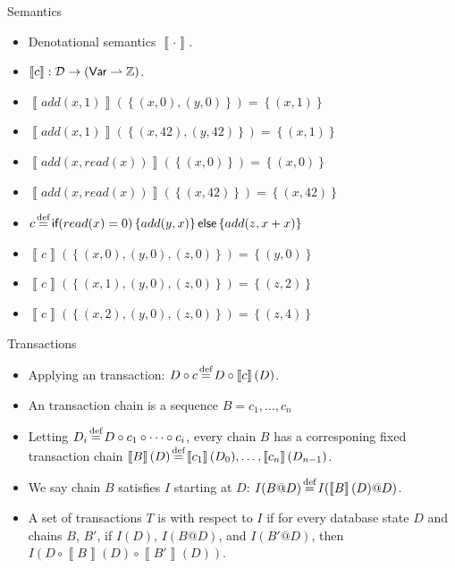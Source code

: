 \documentclass[xcolor={dvipsnames,svgnames,table}]{beamer}
\newcommand{\defeq}{\stackrel{\mathclap{\normalfont\mbox{\scriptsize def}}}{=}}
\newcommand{\denote}[1]{\left\llbracket#1\right\rrbracket}
\newcommand{\set}[1]{\left\{#1\right\}}
\begin{document}
\begin{frame}{\imp{} Semantics}
  \begin{itemize}
    \item Denotational semantics $\denote{\cdot}$.
    \item $\denote{c}: \dbs \to (\var \rightharpoonup \ints)$.
    \item $\denote{add(x, 1)}(\set{(x, 0), (y, 0)}) = \set{(x, 1)}$
    \item $\denote{add(x, 1)}(\set{(x, 42), (y, 42)}) = \set{(x, 1)}$
    \item $\denote{add(x, read(x))}(\set{(x, 0)}) = \set{(x, 0)}$
    \item $\denote{add(x, read(x))}(\set{(x, 42)}) = \set{(x, 42)}$
    \item $c \defeq \impif{read(x)=0}{add(y, x)}{add(z, x + x)}$
    \item $\denote{c}(\set{(x, 0), (y, 0), (z, 0)}) = \set{(y, 0)}$
    \item $\denote{c}(\set{(x, 1), (y, 0), (z, 0)}) = \set{(z, 2)}$
    \item $\denote{c}(\set{(x, 2), (y, 0), (z, 0)}) = \set{(z, 4)}$
  \end{itemize}
\end{frame}

\begin{frame}{\imp{} Transactions}
  \begin{itemize}
    \item
      Applying an \imp{} transaction: $D \circ c \defeq D \circ \denote{c}(D)$.
    \item
      An \imp{} transaction chain is a sequence $B = c_1, \ldots, c_n$
    \item
      Letting $D_i \defeq D \circ c_1 \circ \cdots \circ c_i$, every \imp{}
      chain $B$ has a corresponing fixed transaction chain $\denote{B}(D)
      \defeq \denote{c_1}(D_0), \ldots, \denote{c_n}(D_{n-1})$.
    \item
      We say \imp{} chain $B$ satisfies $I$ starting at $D$: $I(B@D) \defeq
      I(\denote{B}(D) @ D)$.
    \item
      A set of \imp{} transactions $T$ is \emph{\iconfluent{}} with respect to
      $I$ if for every database state $D$ and \imp{} chains $B$, $B'$, if
      $I(D)$, $I(B@D)$, and $I(B'@D)$, then $I(D \circ \denote{B}(D) \circ
      \denote{B'}(D))$.
  \end{itemize}
\end{frame}
\end{document}
